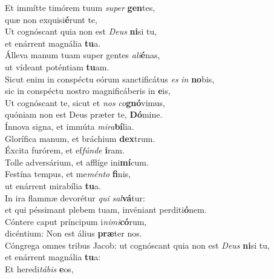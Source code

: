 \evenverse Et immítte timórem tuum \textit{su}\textit{per} \textbf{gen}tes,~\*\\
\evenverse quæ non exquisi\textbf{é}runt te,\\
\oddverse Ut cognóscant quia non est \textit{De}\textit{us} \textbf{ni}si tu,~\*\\
\oddverse et enárrent magnália \textbf{tu}a.\\
\evenverse Álleva manum tuam super gentes \textit{a}\textit{li}\textbf{é}nas,~\*\\
\evenverse ut vídeant poténtiam \textbf{tu}am.\\
\oddverse Sicut enim in conspéctu eórum sanctificátus \textit{es} \textit{in} \textbf{no}bis,~\*\\
\oddverse sic in conspéctu nostro magnificáberis in \textbf{e}is,\\
\evenverse Ut cognóscant te, sicut et \textit{nos} \textit{co}\textbf{gnó}vimus,~\*\\
\evenverse quóniam non est Deus præter te, \textbf{Dó}mine.\\
\oddverse Ínnova signa, et immúta \textit{mi}\textit{ra}\textbf{bí}lia.~\*\\
\oddverse Glorífica manum, et bráchium \textbf{dex}trum.\\
\evenverse Éxcita furórem, et ef\textit{fún}\textit{de} \textbf{i}ram.~\*\\
\evenverse Tolle adversárium, et afflíge ini\textbf{mí}cum.\\
\oddverse Festína tempus, et me\textit{mén}\textit{to} \textbf{fi}nis,~\*\\
\oddverse ut enárrent mirabília \textbf{tu}a.\\
\evenverse In ira flammæ devorétur \textit{qui} \textit{sal}\textbf{vá}tur:~\*\\
\evenverse et qui péssimant plebem tuam, invéniant perditi\textbf{ó}nem.\\
\oddverse Cóntere caput príncipum i\textit{ni}\textit{mi}\textbf{có}rum,~\*\\
\oddverse dicéntium: Non est álius \textbf{præ}ter nos.\\
\evenverse Cóngrega omnes tribus Jacob: ut cognóscant quia non est \textit{De}\textit{us} \textbf{ni}si tu,~\*\\
\evenverse et enárrent magnália \textbf{tu}a:\\
\oddverse Et heredi\textit{tá}\textit{bis} \textbf{e}os,~\*\\
